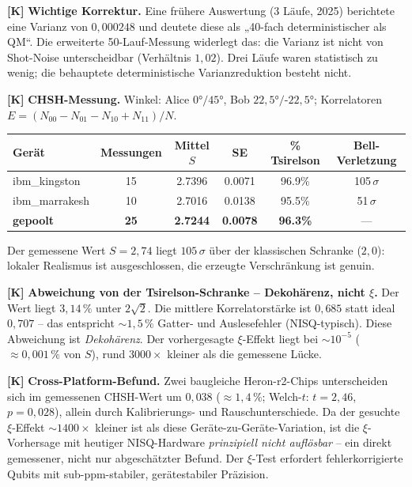 \textbf{[K]} \textbf{Wichtige Korrektur.} Eine frühere Auswertung (3 Läufe,
2025) berichtete eine Varianz von $0{,}000248$ und deutete diese als
„40-fach deterministischer als QM``. Die erweiterte 50-Lauf-Messung widerlegt
das: die Varianz ist nicht von Shot-Noise unterscheidbar (Verhältnis $1{,}02$).
Drei Läufe waren statistisch zu wenig; die behauptete deterministische
Varianzreduktion besteht nicht.

\textbf{[K]} \textbf{CHSH-Messung.} Winkel: Alice $0°/45°$, Bob
$22{,}5°/\text{-}22{,}5°$; Korrelatoren $E=(N_{00}-N_{01}-N_{10}+N_{11})/N$.

\begin{center}
\renewcommand{\arraystretch}{1.3}
{\small
\begin{tabular}{lccccc}
\toprule
Gerät & Messungen & Mittel $S$ & SE & \% Tsirelson & Bell-Verletzung \\
\midrule
ibm\_kingston  & 15 & 2.7396 & 0.0071 & 96.9\% & 105\,$\sigma$ \\
ibm\_marrakesh & 10 & 2.7016 & 0.0138 & 95.5\% & 51\,$\sigma$ \\
\textbf{gepoolt} & \textbf{25} & \textbf{2.7244} & \textbf{0.0078}
                 & \textbf{96.3\%} & --- \\
\bottomrule
\end{tabular}
}
\renewcommand{\arraystretch}{1.0}
\end{center}

Der gemessene Wert $S=2{,}74$ liegt $105\,\sigma$ über der klassischen Schranke
($2{,}0$): lokaler Realismus ist ausgeschlossen, die erzeugte Verschränkung ist
genuin.

\textbf{[K]} \textbf{Abweichung von der Tsirelson-Schranke -- Dekohärenz, nicht
$\xi$.} Der Wert liegt $3{,}14\,\%$ unter $2\sqrt2$. Die mittlere
Korrelatorstärke ist $0{,}685$ statt ideal $0{,}707$ -- das entspricht
$\sim1{,}5\,\%$ Gatter- und Auslesefehler (NISQ-typisch). Diese Abweichung ist
\emph{Dekohärenz}. Der vorhergesagte $\xi$-Effekt liegt bei
$\sim10^{-5}$ ($\approx0{,}001\,\%$ von $S$), rund $3000\times$ kleiner als
die gemessene Lücke.

\textbf{[K]} \textbf{Cross-Platform-Befund.} Zwei baugleiche Heron-r2-Chips
unterscheiden sich im gemessenen CHSH-Wert um $0{,}038$
($\approx1{,}4\,\%$; Welch-$t$: $t=2{,}46$, $p=0{,}028$), allein durch
Kalibrierungs- und Rauschunterschiede. Da der gesuchte $\xi$-Effekt
$\sim1400\times$ kleiner ist als diese Geräte-zu-Geräte-Variation, ist die
$\xi$-Vorhersage mit heutiger NISQ-Hardware \emph{prinzipiell nicht auflösbar}
-- ein direkt gemessener, nicht nur abgeschätzter Befund. Der $\xi$-Test
erfordert fehlerkorrigierte Qubits mit sub-ppm-stabiler, gerätestabiler
Präzision.

